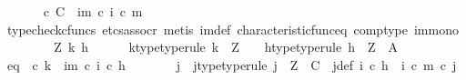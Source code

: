 \begin{isabellebody}
\ \ \ \ \isamarkupfalse%
\ {\isachardoublequoteopen}{\isasymt}\ {\isasymcirc}\isactrlsub c\ {\isasymbeta}\isactrlbsub C\isactrlesub \ {\isacharequal}{\kern0pt}\ {\isacharparenleft}{\kern0pt}{\isasymchi}im\ {\isasymcirc}\isactrlsub c\ i{\isacharparenright}{\kern0pt}\ {\isasymcirc}\isactrlsub c\ m{\isachardoublequoteclose}\isanewline
\ \ \ \ \ \ \isamarkupfalse%
\ {\isacharparenleft}{\kern0pt}typecheck{\isacharunderscore}{\kern0pt}cfuncs{\isacharcomma}{\kern0pt}\ etcs{\isacharunderscore}{\kern0pt}assocr{\isacharcomma}{\kern0pt}\ metis\ {\isasymchi}im{\isacharunderscore}{\kern0pt}def\ characteristic{\isacharunderscore}{\kern0pt}func{\isacharunderscore}{\kern0pt}eq\ comp{\isacharunderscore}{\kern0pt}type\ im{\isacharunderscore}{\kern0pt}mono{\isacharparenright}{\kern0pt}\isanewline
\ \ \isamarkupfalse%
\isanewline
\ \ \ \ \isamarkupfalse%
\ Z\ k\ h\isanewline
\ \ \ \ \isamarkupfalse%
\ k{\isacharunderscore}{\kern0pt}type{\isacharbrackleft}{\kern0pt}type{\isacharunderscore}{\kern0pt}rule{\isacharbrackright}{\kern0pt}{\isacharcolon}{\kern0pt}\ {\isachardoublequoteopen}k\ {\isacharcolon}{\kern0pt}\ Z\ {\isasymrightarrow}\ {\isasymone}{\isachardoublequoteclose}\ \ h{\isacharunderscore}{\kern0pt}type{\isacharbrackleft}{\kern0pt}type{\isacharunderscore}{\kern0pt}rule{\isacharbrackright}{\kern0pt}{\isacharcolon}{\kern0pt}\ {\isachardoublequoteopen}h\ {\isacharcolon}{\kern0pt}\ Z\ {\isasymrightarrow}\ A{\isachardoublequoteclose}\isanewline
\ \ \ \ \isamarkupfalse%
\ eq{\isacharcolon}{\kern0pt}\ {\isachardoublequoteopen}{\isasymt}\ {\isasymcirc}\isactrlsub c\ k\ {\isacharequal}{\kern0pt}\ {\isacharparenleft}{\kern0pt}{\isasymchi}im\ {\isasymcirc}\isactrlsub c\ i{\isacharparenright}{\kern0pt}\ {\isasymcirc}\isactrlsub c\ h{\isachardoublequoteclose}\isanewline
\ \ \ \ \isamarkupfalse%
\ \isamarkupfalse%
\ j\ \ j{\isacharunderscore}{\kern0pt}type{\isacharbrackleft}{\kern0pt}type{\isacharunderscore}{\kern0pt}rule{\isacharbrackright}{\kern0pt}{\isacharcolon}{\kern0pt}\ {\isachardoublequoteopen}j\ {\isacharcolon}{\kern0pt}\ Z\ {\isasymrightarrow}\ C{\isachardoublequoteclose}\ \ j{\isacharunderscore}{\kern0pt}def{\isacharcolon}{\kern0pt}\ {\isachardoublequoteopen}i\ {\isasymcirc}\isactrlsub c\ h\ {\isacharequal}{\kern0pt}\ {\isacharparenleft}{\kern0pt}i\ {\isasymcirc}\isactrlsub c\ m{\isacharparenright}{\kern0pt}\ {\isasymcirc}\isactrlsub c\ j{\isachardoublequoteclose}\isanewline
\ \ \ \ \ \ \isamarkupfalse%

\end{isabellebody}
